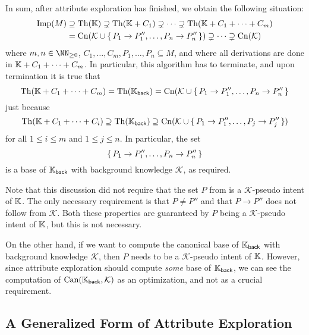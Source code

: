 In sum, after attribute exploration has finished, we obtain the following situation:
\begin{align*}
  \operatorname{Imp}(M) &\supseteq \operatorname{Th}({\mathbb{K}}) \supsetneq \operatorname{Th}({\mathbb{K}} + C_1) \supsetneq \dots \supsetneq
  \operatorname{Th}({\mathbb{K}} + C_1 + \dots + C_m) \\ &= \operatorname{Cn}(\mathcal{K} \cup {\ensuremath{\{\, P_1 \to P_1'', \dots, P_n
    \to P_n'' \,\}}}) \supsetneq \dots \supsetneq \operatorname{Cn}(\mathcal{K})
\end{align*}
where $m, n \in \NN_{\geq 0}$, $C_1, \dots, C_m, P_1, \dots, P_n \subseteq M$, and where
all derivations are done in ${\mathbb{K}} + C_1 + \dots + C_m$.  In particular, this algorithm
has to terminate, and upon termination it is true that
\begin{equation*}
  \operatorname{Th}({\mathbb{K}} + C_1 + \dots + C_m) = \operatorname{Th}({\mathbb{K}}_{\mathsf{back}}) = \operatorname{Cn}(\mathcal{K} \cup
  {\ensuremath{\{\, P_1 \to P_1'', \dots, P_n \to P_n'' \,\}}}
\end{equation*}
just because
\begin{equation*}
  \operatorname{Th}({\mathbb{K}} + C_1 + \dots + C_i) \supseteq \operatorname{Th}({\mathbb{K}}_{\mathsf{back}}) \supseteq
  \operatorname{Cn}(\mathcal{K} \cup {\ensuremath{\{\, P_1 \to P_1'', \dots, P_j \to P_j''\,\}}} )
\end{equation*}
for all $1 \leq i \leq m$ and $1 \leq j \leq n$.  In particular, the set
\begin{equation*}
  {\ensuremath{\{\,P_1 \to P_1'', \dots, P_n \to P_n''\,\}}}
\end{equation*}
is a base of ${\mathbb{K}}_{\mathsf{back}}$ with background knowledge $\mathcal{K}$, as required.

Note that this discussion did not require that the set $P$ from  is a
$\mathcal{K}$-pseudo intent of ${\mathbb{K}}$.  The only necessary requirement is that $P \neq
P''$ and that $P \to P''$ does not follow from $\mathcal{K}$.  Both these properties are
guaranteed by $P$ being a $\mathcal{K}$-pseudo intent of ${\mathbb{K}}$, but this is not
necessary.

On the other hand, if we want to compute the canonical base of ${\mathbb{K}}_{\mathsf{back}}$
with background knowledge $\mathcal{K}$, then $P$ needs to be a $\mathcal{K}$-pseudo
intent of ${\mathbb{K}}$.  However, since attribute exploration should compute \emph{some} base
of ${\mathbb{K}}_{\mathsf{back}}$, we can see the computation of $\operatorname{Can}({\mathbb{K}}_{\mathsf{back}},
\mathcal{K})$ as an optimization, and not as a crucial requirement.

\subsection{A Generalized Form of Attribute Exploration}
\label{sec:gener-form-attr}

